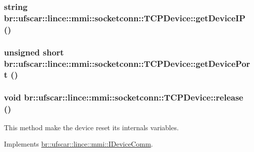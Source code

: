 \hypertarget{classbr_1_1ufscar_1_1lince_1_1mmi_1_1socketconn_1_1TCPDevice_a3d899beea9a5d297ee21931be41684ec}{
\subsubsection[{getDeviceIP}]{\setlength{\rightskip}{0pt plus 5cm}string br::ufscar::lince::mmi::socketconn::TCPDevice::getDeviceIP ()}}
\label{classbr_1_1ufscar_1_1lince_1_1mmi_1_1socketconn_1_1TCPDevice_a3d899beea9a5d297ee21931be41684ec}
\hypertarget{classbr_1_1ufscar_1_1lince_1_1mmi_1_1socketconn_1_1TCPDevice_a163fd810dccd2682328735a02699372d}{
\subsubsection[{getDevicePort}]{\setlength{\rightskip}{0pt plus 5cm}unsigned short br::ufscar::lince::mmi::socketconn::TCPDevice::getDevicePort ()}}
\label{classbr_1_1ufscar_1_1lince_1_1mmi_1_1socketconn_1_1TCPDevice_a163fd810dccd2682328735a02699372d}
\hypertarget{classbr_1_1ufscar_1_1lince_1_1mmi_1_1socketconn_1_1TCPDevice_a4004f2bdb8466c2613654469d0863f78}{
\subsubsection[{release}]{\setlength{\rightskip}{0pt plus 5cm}void br::ufscar::lince::mmi::socketconn::TCPDevice::release ()}}
\label{classbr_1_1ufscar_1_1lince_1_1mmi_1_1socketconn_1_1TCPDevice_a4004f2bdb8466c2613654469d0863f78}


This method make the device reset its internals variables. 



Implements \hyperlink{classbr_1_1ufscar_1_1lince_1_1mmi_1_1IDeviceComm_a9c173ebb83a502e78143a52fc7d87a80}{br::ufscar::lince::mmi::IDeviceComm}.

